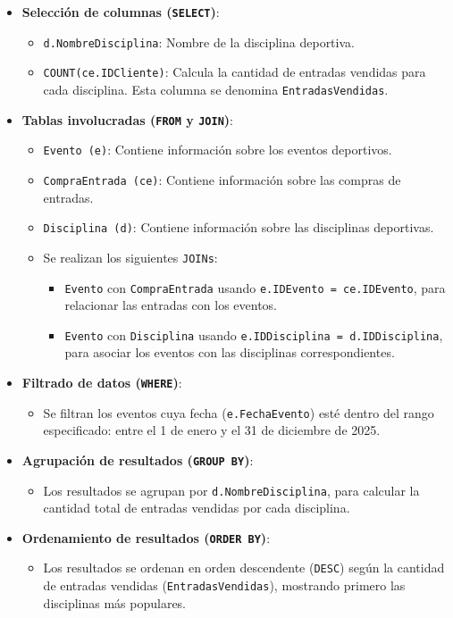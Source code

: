 \begin{itemize}
   \item \textbf{Selección de columnas (\texttt{SELECT})}:
   \begin{itemize}
       \item \texttt{d.NombreDisciplina}: Nombre de la disciplina deportiva.
       \item \texttt{COUNT(ce.IDCliente)}: Calcula la cantidad de entradas vendidas para cada disciplina. Esta columna se denomina \texttt{EntradasVendidas}.
   \end{itemize}

   \item \textbf{Tablas involucradas (\texttt{FROM} y \texttt{JOIN})}:
   \begin{itemize}
       \item \texttt{Evento (e)}: Contiene información sobre los eventos deportivos.
       \item \texttt{CompraEntrada (ce)}: Contiene información sobre las compras de entradas.
       \item \texttt{Disciplina (d)}: Contiene información sobre las disciplinas deportivas.
       \item Se realizan los siguientes \texttt{JOINs}:
       \begin{itemize}
           \item \texttt{Evento} con \texttt{CompraEntrada} usando \texttt{e.IDEvento = ce.IDEvento}, para relacionar las entradas con los eventos.
           \item \texttt{Evento} con \texttt{Disciplina} usando \texttt{e.IDDisciplina = d.IDDisciplina}, para asociar los eventos con las disciplinas correspondientes.
       \end{itemize}
   \end{itemize}

   \item \textbf{Filtrado de datos (\texttt{WHERE})}:
   \begin{itemize}
       \item Se filtran los eventos cuya fecha (\texttt{e.FechaEvento}) esté dentro del rango especificado: entre el 1 de enero y el 31 de diciembre de 2025.
   \end{itemize}

   \item \textbf{Agrupación de resultados (\texttt{GROUP BY})}:
   \begin{itemize}
       \item Los resultados se agrupan por \texttt{d.NombreDisciplina}, para calcular la cantidad total de entradas vendidas por cada disciplina.
   \end{itemize}

   \item \textbf{Ordenamiento de resultados (\texttt{ORDER BY})}:
   \begin{itemize}
       \item Los resultados se ordenan en orden descendente (\texttt{DESC}) según la cantidad de entradas vendidas (\texttt{EntradasVendidas}), mostrando primero las disciplinas más populares.
   \end{itemize}
\end{itemize}

